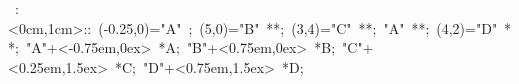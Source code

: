 


\hbox{
\xy    <1cm,0cm>:<0cm,1cm>::
       (-0.25,0)="A" ; (5,0)="B" **\dir{-}; 
       (3,4)="C" **\dir{-}; "A" **\dir{-};
       (4,2)="D" **\dir{-};
       "A"+<-0.75em,0ex> *{A};
       "B"+<0.75em,0ex> *{B};
       "C"+<0.25em,1.5ex> *{C};
       "D"+<0.75em,1.5ex> *{D};
       \endxy}
	   
